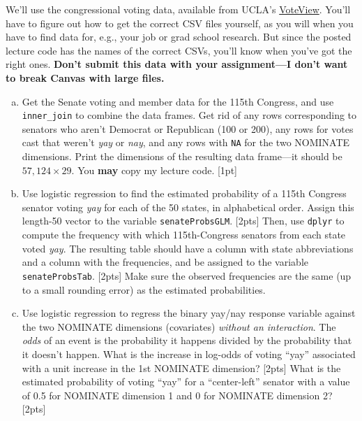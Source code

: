 \documentclass[12pt]{article}
\begin{document}
We'll use the congressional voting data, available from UCLA's \href{https://www.voteview.com/data}{VoteView}. You'll have to figure out how to get the correct CSV files yourself, as you will when you have to find data for, e.g., your job or grad school research. But since the posted lecture code has the names of the correct CSVs, you'll know when you've got the right ones. \textbf{Don't submit this data with your assignment---I don't want to break Canvas with large files.}

\begin{enumerate}[(a)]
	\item Get the Senate voting and member data for the 115th Congress, and use \verb|inner_join| to combine the data frames. Get rid of any rows corresponding to senators who aren't Democrat or Republican (100 or 200), any rows for votes cast that weren't \textit{yay} or \textit{nay}, and any rows with \verb|NA| for the two NOMINATE dimensions. Print the dimensions of the resulting data frame---it should be $57,124 \times 29$. You \textbf{may} copy my lecture code. [1pt]
	\item Use logistic regression to find the estimated probability of a 115th Congress senator voting \textit{yay} for each of the 50 states, in alphabetical order. Assign this length-50 vector to the variable \verb|senateProbsGLM|. [2pts] Then, use \verb|dplyr| to compute the frequency with which 115th-Congress senators from each state voted \textit{yay}. The resulting table should have a column with state abbreviations and a column with the frequencies, and be assigned to the variable \verb|senateProbsTab|. [2pts] Make sure the observed frequencies are the same (up to a small rounding error) as the estimated probabilities.
	\item Use logistic regression to regress the binary yay/nay response variable against the two NOMINATE dimensions (covariates) \textit{without an interaction}. The \textit{odds} of an event is the probability it happens divided by the probability that it doesn't happen. What is the increase in log-odds of voting ``yay'' associated with a unit increase in the 1st NOMINATE dimension? [2pts] What is the estimated probability of voting ``yay'' for a ``center-left'' senator with a value of 0.5 for NOMINATE dimension 1 and 0 for NOMINATE dimension 2? [2pts]
\end{enumerate}
\end{document}
